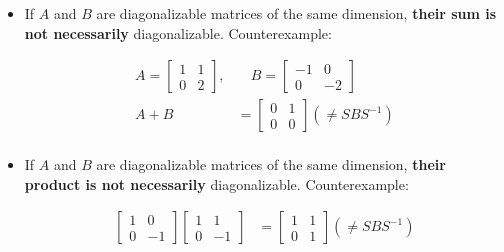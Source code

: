 \documentclass[12pt]{article}
\begin{document}
{{\begin{itemize}
    \begin{align*}
        A &= SDS^{-1}\\
        A^{\red{-1}} &= (SDS^{-1})^{\red{-1}}\\
        &= S^{-1}D^{-1}S\\
    \end{align*}

    Thus, we can write $A^{-1}$ in the form required for it to be diagonalizable. We can also see that $A^{-1}$ has the same eigenvalues as $A$ but raised to the power of $-1$.
    \item If $A$ and $B$ are diagonalizable matrices of the same dimension, \textbf{their sum is not necessarily} diagonalizable. Counterexample:

    \begin{align*}
        A = \begin{bmatrix}
            1 & 1\\
            0 & 2
        \end{bmatrix}, &\quad B = \begin{bmatrix}
            -1 & 0\\
            0 & -2
        \end{bmatrix}\\
        A + B &= \begin{bmatrix}
            0 & 1\\
            0 & 0
        \end{bmatrix} (\neq SBS^{-1})\\
    \end{align*}
    \item If $A$ and $B$ are diagonalizable matrices of the same dimension, \textbf{their product is not necessarily} diagonalizable. Counterexample:
    
    \begin{align*}
        \begin{bmatrix}
            1 & 0\\
            0 & -1
        \end{bmatrix}\begin{bmatrix}
            1 & 1\\
            0 & -1
        \end{bmatrix} &= \begin{bmatrix}
            1 & 1\\
            0 & 1
        \end{bmatrix} (\neq SBS^{-1})\\
    \end{align*}
\end{itemize}

}}
\end{document}
